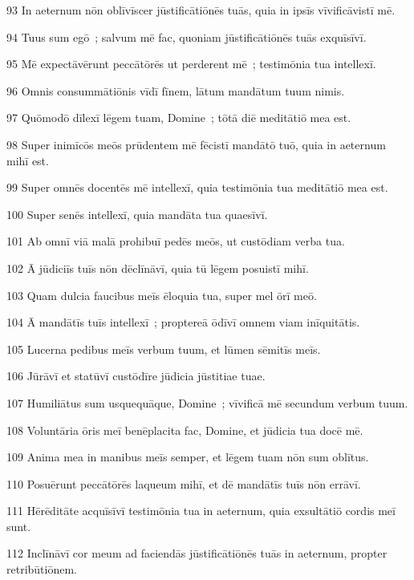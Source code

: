 \psalmVerse
  {\phantom{0}93}
  {In aeternum nōn oblīvīscer jūstificātiōnēs tuās, quia in ipsīs vīvificāvistī mē.}


\psalmVerse
  {\phantom{0}94}
  {Tuus sum egō~; salvum mē fac, quoniam jūstificātiōnēs tuās exquīsīvī.}


\psalmVerse
  {\phantom{0}95}
  {Mē expectāvērunt peccātōrēs ut perderent mē~; testimōnia tua intellexī.}


\psalmVerse
  {\phantom{0}96}
  {Omnis consummātiōnis vīdī fīnem, lātum mandātum tuum nimis.}


\psalmVerse
  {\phantom{0}97}
  {Quōmodō dīlexī lēgem tuam, Domine~; tōtā diē meditātiō mea est.}


\psalmVerse
  {\phantom{0}98}
  {Super inimīcōs meōs prūdentem mē fēcistī mandātō tuō, quia in aeternum mihī est.}


\psalmVerse
  {\phantom{0}99}
  {Super omnēs docentēs mē intellexī, quia testimōnia tua meditātiō mea est.}


\psalmVerse
  {100}
  {Super senēs intellexī, quia mandāta tua quaesīvī.}


\psalmVerse
  {101}
  {Ab omnī viā malā prohibuī pedēs meōs, ut custōdiam verba tua.}


\psalmVerse
  {102}
  {Ā jūdiciīs tuīs nōn dēclīnāvī, quia tū lēgem posuistī mihī.}


\psalmVerse
  {103}
  {Quam dulcia faucibus meīs ēloquia tua, super mel ōrī meō.}


\psalmVerse
  {104}
  {Ā mandātīs tuīs intellexī~; proptereā ōdīvī omnem viam inīquitātis.}


\psalmVerse
  {105}
  {Lucerna pedibus meīs verbum tuum, et lūmen sēmitīs meīs.}


\psalmVerse
  {106}
  {Jūrāvī et statūvī custōdīre jūdicia jūstitiae tuae.}


\psalmVerse
  {107}
  {Humiliātus sum usquequāque, Domine~; vīvificā mē secundum verbum tuum.}


\psalmVerse
  {108}
  {Voluntāria ōris meī benēplacita fac, Domine, et jūdicia tua docē mē.}


\psalmVerse
  {109}
  {Anima mea in manibus meīs semper, et lēgem tuam nōn sum oblītus.}


\psalmVerse
  {110}
  {Posuērunt peccātōrēs laqueum mihī, et dē mandātīs tuīs nōn errāvī.}


\psalmVerse
  {111}
  {Hērēditāte acquīsīvī testimōnia tua in aeternum, quia exsultātiō cordis meī sunt.}


\psalmVerse
  {112}
  {Inclīnāvī cor meum ad faciendās jūstificātiōnēs tuās in aeternum, propter retribūtiōnem.}


